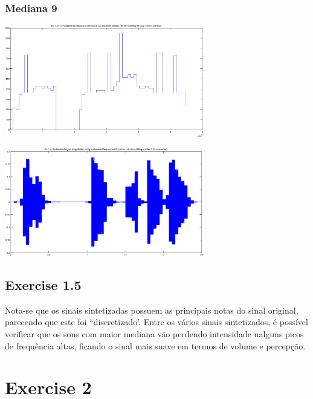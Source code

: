 \documentclass[a4paper]{article}
\begin{document}
\subsubsection{Mediana 9}
\begin{center}
	\includegraphics[width=0.65\textwidth]{images/ex_1_3_succession_9.png}
\end{center}
\begin{center}
	\includegraphics[width=0.65\textwidth]{images/ex_1_4_synth_9.png}
\end{center}

\subsection{Exercise 1.5}
\indent \indent Nota-se que os sinais sintetizadas possuem as principais notas do sinal original, parecendo que este foi ``discretizado'. Entre os vários sinais sintetizados, é possível verificar que os sons com maior mediana vão perdendo intensidade nalguns picos de frequência altas, ficando o sinal mais suave em termos de volume e percepção.

\clearpage

\section{Exercise 2}
\end{document}
